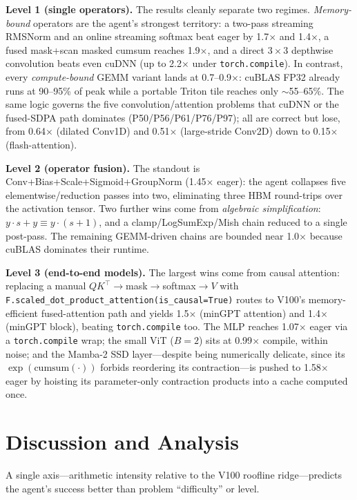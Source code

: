 \documentclass[conference]{IEEEtran}
\begin{document}
\textbf{Level 1 (single operators).} The results cleanly separate two regimes.
\emph{Memory-bound} operators are the agent's strongest territory: a two-pass
streaming RMSNorm and an online streaming softmax beat eager by 1.7$\times$ and
1.4$\times$, a fused mask+scan masked cumsum reaches 1.9$\times$, and a direct
$3\times3$ depthwise convolution beats even cuDNN (up to 2.2$\times$ under
\texttt{torch.compile}). In contrast, every \emph{compute-bound} GEMM variant
lands at 0.7--0.9$\times$: cuBLAS FP32 already runs at 90--95\% of peak while a
portable Triton tile reaches only $\sim$55--65\%. The same logic governs the
five convolution/attention problems that cuDNN or the fused-SDPA path dominates
(P50/P56/P61/P76/P97); all are correct but lose, from 0.64$\times$ (dilated
Conv1D) and 0.51$\times$ (large-stride Conv2D) down to 0.15$\times$
(flash-attention).

\textbf{Level 2 (operator fusion).} The standout is
Conv+Bias+Scale+Sigmoid+GroupNorm (1.45$\times$ eager): the agent collapses five
elementwise/reduction passes into two, eliminating three HBM round-trips over
the activation tensor. Two further wins come from \emph{algebraic
simplification}: $y\cdot s+y\equiv y\cdot(s{+}1)$, and a clamp/LogSumExp/Mish
chain reduced to a single post-pass. The remaining GEMM-driven chains are
bounded near 1.0$\times$ because cuBLAS dominates their runtime.

\textbf{Level 3 (end-to-end models).} The largest wins come from causal
attention: replacing a manual $QK^\top\!\to$mask$\to$softmax$\to V$ with
\texttt{F.scaled\_dot\_product\_attention(is\_causal=True)} routes to V100's
memory-efficient fused-attention path and yields 1.5$\times$ (minGPT attention)
and 1.4$\times$ (minGPT block), beating \texttt{torch.compile} too. The MLP
reaches 1.07$\times$ eager via a \texttt{torch.compile} wrap; the small ViT
($B{=}2$) sits at 0.99$\times$ compile, within noise; and the Mamba-2 SSD
layer---despite being numerically delicate, since its
$\exp(\mathrm{cumsum}(\cdot))$ forbids reordering its contraction---is pushed to
1.58$\times$ eager by hoisting its parameter-only contraction products into a
cache computed once.

\section{Discussion and Analysis}
A single axis---arithmetic intensity relative to the V100 roofline ridge---predicts
the agent's success better than problem ``difficulty'' or level.
\end{document}
